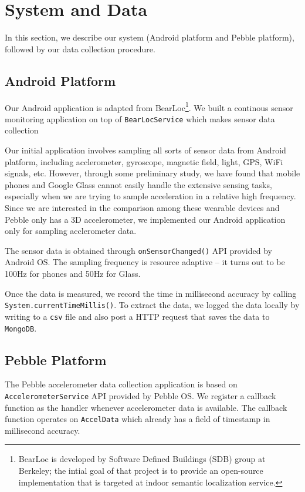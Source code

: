 \section{System and Data}
\label{sec:data-collection}

In this section, we describe our system (Android platform and Pebble platform), followed by our data collection procedure.

\subsection{Android Platform}
\label{sec:android-platform}

Our Android application is adapted from BearLoc\footnote{BearLoc is developed by Software Defined Buildings (SDB) group at Berkeley; the intial goal of that project is to provide an open-source implementation that is targeted at indoor semantic localization service.}. We built a continous sensor monitoring application on top of \texttt{BearLocService} which makes sensor data collection

Our initial application involves sampling all sorts of sensor data from Android platform, including acclerometer, gyroscope, magnetic field, light, GPS, WiFi signals, etc. However, through some preliminary study, we have found that mobile phones and Google Glass cannot easily handle the extensive sensing tasks, especially when we are trying to sample acceleration in a relative high frequency. Since we are interested in the comparison among these wearable devices and Pebble only has a 3D accelerometer, we implemented our Android application only for sampling acclerometer data.

The sensor data is obtained through \texttt{onSensorChanged()} API provided by Android OS. The sampling frequency is resource adaptive -- it turns out to be 100Hz for phones and 50Hz for Glass. 

Once the data is measured, we record the time in millisecond accuracy by calling \texttt{System.currentTimeMillis()}. To extract the data, we logged the data locally by writing to a \texttt{csv} file and also post a HTTP request that saves the data to \texttt{MongoDB}.

\subsection{Pebble Platform}
\label{sec:pebble-platform}

The Pebble accelerometer data collection application is based on \texttt{AccelerometerService} API provided by Pebble OS. We register a callback function as the handler whenever accelerometer data is available. The callback function operates on \texttt{AccelData} which already has a field of timestamp in millisecond accuracy. 

